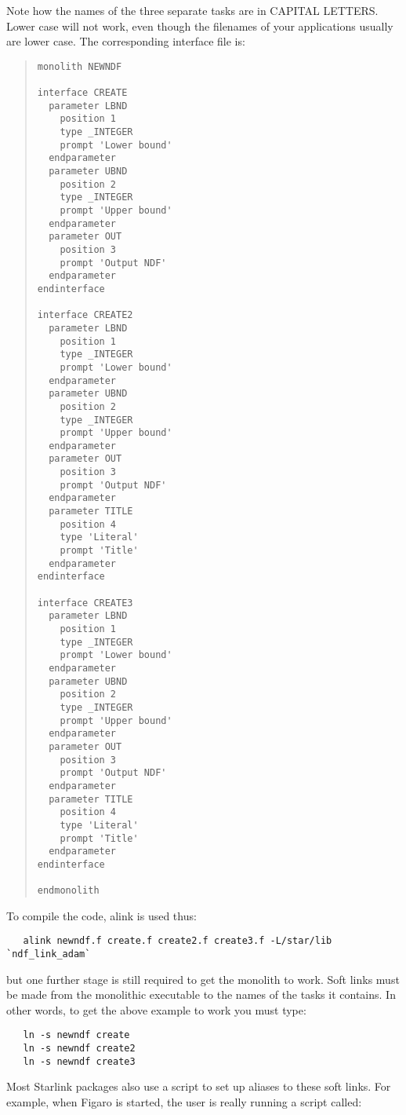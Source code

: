 Note how the names of the three separate tasks are in CAPITAL LETTERS.
Lower case will not work, even though the filenames of your applications
usually are lower case. The corresponding interface file is:

\begin{quote}
{\small
\begin{verbatim}
monolith NEWNDF

interface CREATE
  parameter LBND
    position 1
    type _INTEGER
    prompt 'Lower bound'
  endparameter
  parameter UBND
    position 2
    type _INTEGER
    prompt 'Upper bound'
  endparameter
  parameter OUT
    position 3
    prompt 'Output NDF'
  endparameter
endinterface

interface CREATE2
  parameter LBND
    position 1
    type _INTEGER
    prompt 'Lower bound'
  endparameter
  parameter UBND
    position 2
    type _INTEGER
    prompt 'Upper bound'
  endparameter
  parameter OUT
    position 3
    prompt 'Output NDF'
  endparameter
  parameter TITLE
    position 4
    type 'Literal'
    prompt 'Title'
  endparameter
endinterface

interface CREATE3
  parameter LBND
    position 1
    type _INTEGER
    prompt 'Lower bound'
  endparameter
  parameter UBND
    position 2
    type _INTEGER
    prompt 'Upper bound'
  endparameter
  parameter OUT
    position 3
    prompt 'Output NDF'
  endparameter
  parameter TITLE
    position 4
    type 'Literal'
    prompt 'Title'
  endparameter
endinterface

endmonolith
\end{verbatim}
}
\end{quote}

To compile the code, {\sf alink} is used thus:

\begin{verbatim}
   alink newndf.f create.f create2.f create3.f -L/star/lib `ndf_link_adam`
\end{verbatim}

but one further stage is still required to get the monolith to work. Soft
links must be made from the monolithic executable to the names of the
tasks it contains. In other words, to get the above example to work you
must type:

\begin{verbatim}
   ln -s newndf create
   ln -s newndf create2
   ln -s newndf create3
\end{verbatim}

Most Starlink packages also use a script to set up aliases to these
soft links. For example, when Figaro is started, the user is really
running a script called:

